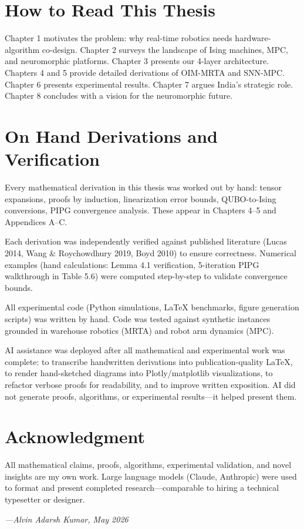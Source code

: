 \section*{How to Read This Thesis}

Chapter 1 motivates the problem: why real-time robotics needs hardware-algorithm co-design. Chapter 2 surveys the landscape of Ising machines, MPC, and neuromorphic platforms. Chapter 3 presents our 4-layer architecture. Chapters 4 and 5 provide detailed derivations of OIM-MRTA and SNN-MPC. Chapter 6 presents experimental results. Chapter 7 argues India's strategic role. Chapter 8 concludes with a vision for the neuromorphic future.

\section*{On Hand Derivations and Verification}

Every mathematical derivation in this thesis was worked out by hand: tensor expansions, proofs by induction, linearization error bounds, QUBO-to-Ising conversions, PIPG convergence analysis. These appear in Chapters 4--5 and Appendices A--C.

Each derivation was independently verified against published literature (Lucas 2014, Wang \& Roychowdhury 2019, Boyd 2010) to ensure correctness. Numerical examples (hand calculations: Lemma 4.1 verification, 5-iteration PIPG walkthrough in Table 5.6) were computed step-by-step to validate convergence bounds.

All experimental code (Python simulations, LaTeX benchmarks, figure generation scripts) was written by hand. Code was tested against synthetic instances grounded in warehouse robotics (MRTA) and robot arm dynamics (MPC).

AI assistance was deployed after all mathematical and experimental work was complete: to transcribe handwritten derivations into publication-quality LaTeX, to render hand-sketched diagrams into Plotly/matplotlib visualizations, to refactor verbose proofs for readability, and to improve written exposition. AI did not generate proofs, algorithms, or experimental results---it helped present them.

\section*{Acknowledgment}

All mathematical claims, proofs, algorithms, experimental validation, and novel insights are my own work. Large language models (Claude, Anthropic) were used to format and present completed research---comparable to hiring a technical typesetter or designer.

\textit{---Alvin Adarsh Kumar, May 2026}
